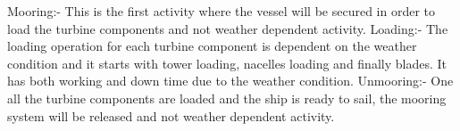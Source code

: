 Mooring:- This is the first activity where the vessel will be secured in order to load the turbine components and not weather dependent activity.
Loading:- The loading operation for each turbine component is dependent on the weather condition and it starts with tower loading, nacelles loading and finally blades. It has both working and down time due to the weather condition.
Unmooring:- One all the turbine components are loaded and the ship is ready to sail, the mooring system will be released and not weather dependent activity.